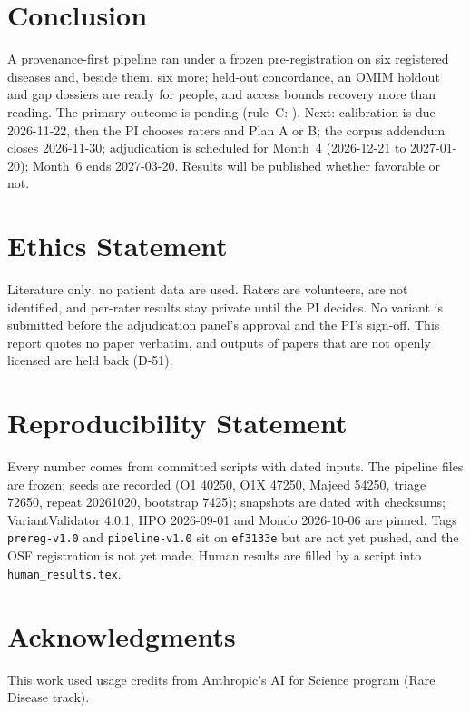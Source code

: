 \documentclass{article} %
\begin{document}
\section{Conclusion}
\label{sec:conclusion}
A provenance-first pipeline ran under a frozen pre-registration on six registered diseases and, beside them, six more; held-out concordance, an OMIM holdout and gap dossiers are ready for people, and access bounds recovery more than reading. The primary outcome is pending (rule~C: ). Next: calibration is due 2026-11-22, then the PI chooses raters and Plan A or B; the corpus addendum closes 2026-11-30; adjudication is scheduled for Month~4 (2026-12-21 to 2027-01-20); Month~6 ends 2027-03-20. Results will be published whether favorable or not.

\section*{Ethics Statement}
Literature only; no patient data are used. Raters are volunteers, are not identified, and per-rater results stay private until the PI decides. No variant is submitted before the adjudication panel's approval and the PI's sign-off. This report quotes no paper verbatim, and outputs of papers that are not openly licensed are held back (D-51).

\section*{Reproducibility Statement}
Every number comes from committed scripts with dated inputs. The pipeline files are frozen; seeds are recorded (O1 40250, O1X 47250, Majeed 54250, triage 72650, repeat 20261020, bootstrap 7425); snapshots are dated with checksums; VariantValidator 4.0.1, HPO 2026-09-01 and Mondo 2026-10-06 are pinned. Tags \texttt{prereg-v1.0} and \texttt{pipeline-v1.0} sit on \texttt{ef3133e} but are not yet pushed, and the OSF registration is not yet made. Human results are filled by a script into \texttt{human\_results.tex}.

\section*{Acknowledgments}
This work used usage credits from Anthropic's AI for Science program (Rare Disease track).



\end{document}
